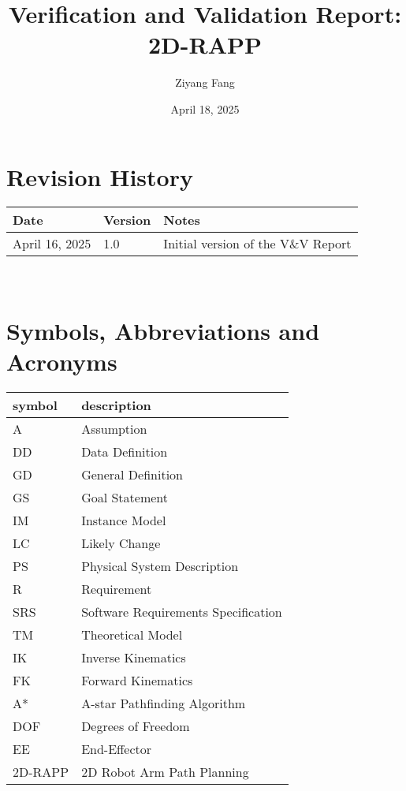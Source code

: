 \documentclass[12pt, titlepage]{article}
\begin{document}
\title{Verification and Validation Report: 2D-RAPP} 
\author{Ziyang Fang}
\date{April 18, 2025}
	
\maketitle


\section{Revision History}

\begin{tabularx}{\textwidth}{p{3cm}p{2cm}X}
\toprule {\bf Date} & {\bf Version} & {\bf Notes}\\
\midrule
April 16, 2025 & 1.0 & Initial version of the V\&V Report \\
\bottomrule
\end{tabularx}

~\newpage

\section{Symbols, Abbreviations and Acronyms}

\renewcommand{\arraystretch}{1.2}
\begin{tabular}{l l} 
    \toprule		
    \textbf{symbol} & \textbf{description}\\
    \midrule 
    A & Assumption\\
    DD & Data Definition\\
    GD & General Definition\\
    GS & Goal Statement\\
    IM & Instance Model\\
    LC & Likely Change\\
    PS & Physical System Description\\
    R & Requirement\\
    SRS & Software Requirements Specification\\
    TM & Theoretical Model\\
    IK & Inverse Kinematics \\
    FK & Forward Kinematics \\
    A* & A-star Pathfinding Algorithm \\
    DOF & Degrees of Freedom \\
    EE & End-Effector \\
    2D-RAPP & 2D Robot Arm Path Planning\\
    \bottomrule
  \end{tabular}\\
\end{document}

